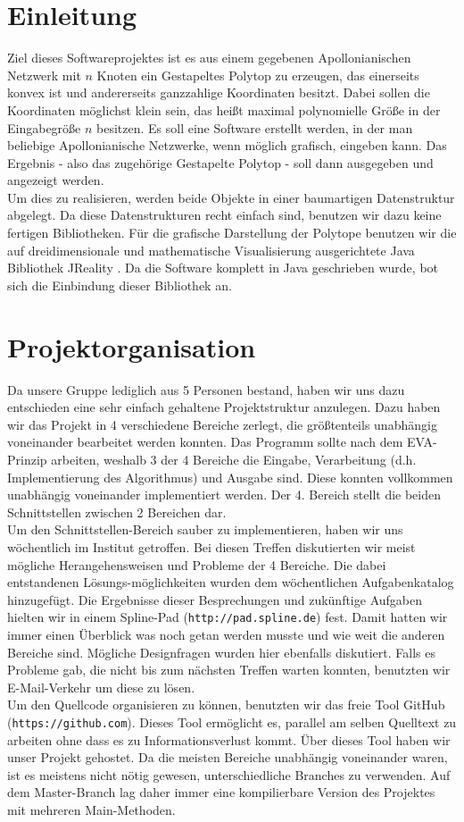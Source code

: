 \section*{Einleitung}
Ziel dieses Softwareprojektes ist es aus einem gegebenen Apollonianischen Netzwerk mit $n$ Knoten ein Gestapeltes Polytop zu erzeugen, das einerseits konvex ist und andererseits ganzzahlige Koordinaten besitzt. Dabei sollen die Koordinaten möglichst klein sein, das heißt maximal polynomielle Größe in der Eingabegröße $n$ besitzen. Es soll eine Software erstellt werden, in der man beliebige Apollonianische Netzwerke, wenn möglich grafisch, eingeben kann. Das Ergebnis - also das zugehörige Gestapelte Polytop - soll dann ausgegeben und angezeigt werden.\\
Um dies zu realisieren, werden beide Objekte in einer baumartigen Datenstruktur abgelegt. Da diese Datenstrukturen recht einfach sind, benutzen wir dazu keine fertigen Bibliotheken. Für die grafische Darstellung der Polytope benutzen wir die auf dreidimensionale und mathematische Visualisierung ausgerichtete Java Bibliothek JReality \cite{jreality}. Da die Software komplett in Java geschrieben wurde, bot sich die Einbindung dieser Bibliothek an.

\section*{Projektorganisation}
Da unsere Gruppe lediglich aus 5 Personen bestand, haben wir uns dazu entschieden eine sehr einfach gehaltene Projektstruktur anzulegen. Dazu haben wir das Projekt in 4 verschiedene Bereiche zerlegt, die größtenteils unabhängig voneinander bearbeitet werden konnten. Das Programm sollte nach dem EVA-Prinzip arbeiten, weshalb 3 der 4 Bereiche die Eingabe, Verarbeitung (d.h. Implementierung des Algorithmus) und Ausgabe sind. Diese konnten vollkommen unabhängig voneinander implementiert werden. Der 4. Bereich stellt die beiden Schnittstellen zwischen 2 Bereichen dar.\\
Um den Schnittstellen-Bereich sauber zu implementieren, haben wir uns wöchentlich im Institut getroffen. Bei diesen Treffen diskutierten wir meist mögliche Herangehensweisen und Probleme der 4 Bereiche. Die dabei entstandenen Lösungs-möglichkeiten wurden dem wöchentlichen Aufgabenkatalog hinzugefügt. Die Ergebnisse dieser Besprechungen und zukünftige Aufgaben hielten wir in einem Spline-Pad (\texttt{http://pad.spline.de}) fest. Damit hatten wir immer einen Überblick was noch getan werden musste und wie weit die anderen Bereiche sind. Mögliche Designfragen wurden hier ebenfalls diskutiert. Falls es Probleme gab, die nicht bis zum nächsten Treffen warten konnten, benutzten wir E-Mail-Verkehr um diese zu lösen.\\
Um den Quellcode organisieren zu können, benutzten wir das freie Tool GitHub (\texttt{https://github.com}). Dieses Tool ermöglicht es, parallel am selben Quelltext zu arbeiten ohne dass es zu Informationsverlust kommt. Über dieses Tool haben wir unser Projekt gehostet. Da die meisten Bereiche unabhängig voneinander waren, ist es meistens nicht nötig gewesen, unterschiedliche Branches zu verwenden. Auf dem Master-Branch lag daher immer eine kompilierbare Version des Projektes mit mehreren Main-Methoden.

